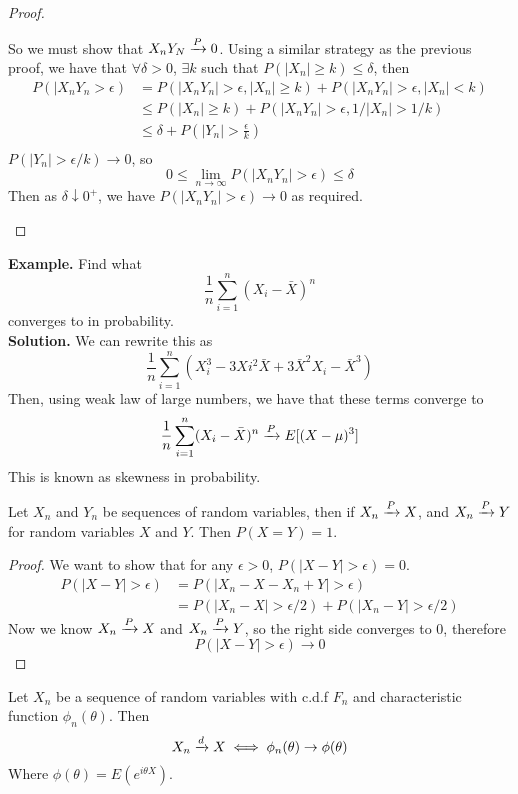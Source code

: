 \begin{proof}
\begin{enumerate}[label=(\roman*)]
        So we must show that $X_nY_N \xrightarrow{P} 0$. Using a similar strategy as the previous proof, we have that $\forall \delta > 0$, $\exists k$ such that $P(|X_n| \geq k) \leq \delta$, then 
        \begin{align*}
            P(|X_nY_n > \epsilon) &= P(|X_nY_n| > \epsilon, |X_n| \geq k) + P(|X_nY_n| > \epsilon, |X_n| < k)\\
            &\leq P(|X_n| \geq k) + P(|X_nY_n| > \epsilon, 1/|X_n| > 1/k)\\
            &\leq \delta + P\left(|Y_n| > \frac{\epsilon}{k}\right)\\
        \end{align*}
        $P(|Y_n| > \epsilon/k) \rightarrow 0$, so 
        \[0 \leq \lim_{n\rightarrow \infty} P(|X_nY_n| > \epsilon) \leq \delta\]
        Then as $\delta \downarrow 0^+$, we have $P(|X_nY_n| > \epsilon) \rightarrow 0$ as required.
    \end{enumerate}
\end{proof}
\noindent
\textbf{Example.} Find what 
\[\frac{1}{n}\sum_{i=1}^n (X_i-\bar{X})^n\]
converges to in probability.\\[2ex]
\textbf{Solution.} We can rewrite this as
\[\frac{1}{n}\sum_{i=1}^n (X_i^3 - 3Xi^2\bar{X} + 3\bar{X}^2X_i - \bar{X}^3)\]
Then, using weak law of large numbers, we have that these terms converge to 
\[\frac{1}{n}\sum_{i=1}^n (X_i -\bar{X})^n \xrightarrow{P} E[(X-\mu)^3]\]
This is known as skewness in probability.
\begin{theorem}
    Let $X_n$ and $Y_n$ be sequences of random variables, then if $X_n \xrightarrow{P} X$, and $X_n \xrightarrow{P} Y$ for random variables $X$ and $Y$. Then $P(X = Y) = 1$.
\end{theorem}
\begin{proof}
    We want to show that for any $\epsilon >0$, $P(|X-Y| > \epsilon) = 0$.
    \begin{align*}
        P(|X-Y| > \epsilon) &= P(|X_n - X - X_n +Y| > \epsilon)\\
        &= P(|X_n - X| > \epsilon/2) + P(|X_n - Y| > \epsilon/2)
    \end{align*}    
    Now we know $X_n \xrightarrow{P} X$ and $X_n \xrightarrow{P} Y$, so the right side converges to 0, therefore
    \[P(|X-Y| > \epsilon) \rightarrow 0\]
\end{proof}
\begin{theorem}
    Let $X_n$ be a sequence of random variables with c.d.f $F_n$ and characteristic function $\phi_n(\theta)$. Then 
    \[X_n \xrightarrow{d} X \iff \phi_n(\theta) \rightarrow \phi(\theta)\]
    Where $\phi(\theta) = E(e^{i\theta X})$. 
\end{theorem}
